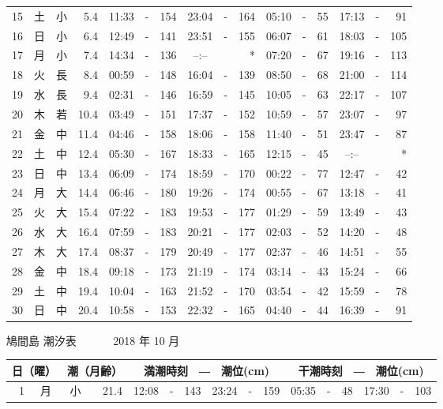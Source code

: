 \documentclass[12pt.a4j]{jsarticle}
\begin{document}
\begin{center}
\begin{table}[ht]
\begin{tabular}{|rc|cr|ccrccr|ccrccr|}
15 & 土 & 小 &  5.4 & 11:33 &-& 154 & 23:04 &-& 164 & 05:10 &-&  55 & 17:13 &-&  91 \\
16 & 日 & 小 &  6.4 & 12:49 &-& 141 & 23:51 &-& 155 & 06:07 &-&  61 & 18:03 &-& 105 \\
17 & 月 & 小 &  7.4 & 14:34 &-& 136 & --:-- & &  *  & 07:20 &-&  67 & 19:16 &-& 113 \\
18 & 火 & 長 &  8.4 & 00:59 &-& 148 & 16:04 &-& 139 & 08:50 &-&  68 & 21:00 &-& 114 \\
19 & 水 & 長 &  9.4 & 02:31 &-& 146 & 16:59 &-& 145 & 10:05 &-&  63 & 22:17 &-& 107 \\
20 & 木 & 若 & 10.4 & 03:49 &-& 151 & 17:37 &-& 152 & 10:59 &-&  57 & 23:07 &-&  97 \\
21 & 金 & 中 & 11.4 & 04:46 &-& 158 & 18:06 &-& 158 & 11:40 &-&  51 & 23:47 &-&  87 \\
22 & 土 & 中 & 12.4 & 05:30 &-& 167 & 18:33 &-& 165 & 12:15 &-&  45 & --:-- & &  *  \\
23 & 日 & 中 & 13.4 & 06:09 &-& 174 & 18:59 &-& 170 & 00:22 &-&  77 & 12:47 &-&  42 \\
24 & 月 & 大 & 14.4 & 06:46 &-& 180 & 19:26 &-& 174 & 00:55 &-&  67 & 13:18 &-&  41 \\
25 & 火 & 大 & 15.4 & 07:22 &-& 183 & 19:53 &-& 177 & 01:29 &-&  59 & 13:49 &-&  43 \\
26 & 水 & 大 & 16.4 & 07:59 &-& 183 & 20:21 &-& 177 & 02:03 &-&  52 & 14:20 &-&  48 \\
27 & 木 & 大 & 17.4 & 08:37 &-& 179 & 20:49 &-& 177 & 02:37 &-&  46 & 14:51 &-&  55 \\
28 & 金 & 中 & 18.4 & 09:18 &-& 173 & 21:19 &-& 174 & 03:14 &-&  43 & 15:24 &-&  66 \\
29 & 土 & 中 & 19.4 & 10:04 &-& 163 & 21:52 &-& 170 & 03:54 &-&  42 & 15:59 &-&  78 \\
30 & 日 & 中 & 20.4 & 10:58 &-& 153 & 22:32 &-& 165 & 04:40 &-&  44 & 16:39 &-&  91 \\
\hline
\end{tabular}
\end{table}
\newpage
{\LARGE 鳩間島  潮汐表　　　}
{\large 2018 年 10 月}\\
\begin{table}[ht]
\begin{tabular}{|rc|cr|ccrccr|ccrccr|}
\hline
\multicolumn{2}{|c|}{日（曜）} & \multicolumn{2}{c|}{潮（月齢）} & \multicolumn{6}{c|}{満潮時刻　―　潮位(cm)} & \multicolumn{6}{c|}{干潮時刻　―　潮位(cm)} \\
\hline
 1 & 月 & 小 & 21.4 & 12:08 &-& 143 & 23:24 &-& 159 & 05:35 &-&  48 & 17:30 &-& 103 \\

\end{tabular}
\end{table}
\end{center}
\end{document}
